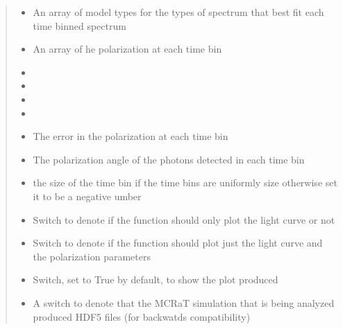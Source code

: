 \documentclass[letterpaper,10pt,english]{sphinxmanual}
\begin{document}
\begin{fulllineitems}
\begin{quote}
\begin{description}
\begin{itemize}
\item {} 
 \textendash{} An array of model types for the types of spectrum that best fit each time binned spectrum

\item {} 
 \textendash{} An array of he polarization at each time bin

\item {} 
 \textendash{} 

\item {} 
 \textendash{} 

\item {} 
 \textendash{} 

\item {} 
 \textendash{} 

\item {} 
 \textendash{} The error in the polarization at each time bin

\item {} 
 \textendash{} The polarization angle of the photons detected in each time bin

\item {} 
 \textendash{} the size of the time bin if the time bins are uniformly size otherwise set it to be a negative umber

\item {} 
 \textendash{} Switch to denote if the function should only plot the light curve or not

\item {} 
 \textendash{} Switch to denote if the function should plot just the light curve and the polarization parameters

\item {} 
 \textendash{} Switch, set to True by default, to show the plot produced

\item {} 
 \textendash{} A switch to denote that the MCRaT simulation that is being analyzed produced HDF5 files (for backwatds compatibility)


\end{itemize}
\end{description}
\end{quote}
\end{fulllineitems}
\end{document}
